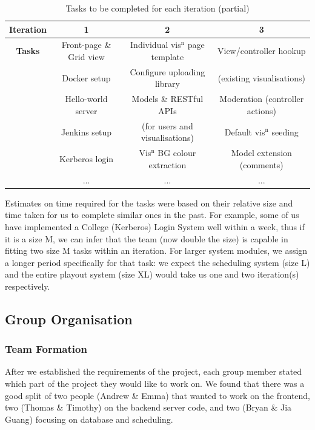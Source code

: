 \documentclass[a4paper, titlepage]{article}
\begin{document}
\begin{table}[h]
  \begin{tabular}{c | c | c | c }
    \textbf{Iteration} & 1 & 2 & 3 \\ \hline
   \textbf{Tasks} & Front-page \& Grid view & Individual vis$^\textrm{n}$ page template & View/controller hookup\\
      & Docker setup & Configure uploading library & (existing visualisations)\\
      & Hello-world server & Models \& RESTful APIs& Moderation (controller actions)\\
      & Jenkins setup & (for users and visualisations)& Default vis$^\textrm{n}$ seeding\\
      & Kerberos login& Vis$^\textrm{n}$ BG colour extraction & Model extension (comments)\\
      & ... & ... & ...
  \end{tabular}
  \caption{Tasks to be completed for each iteration (partial)}
  \label{tab:projman_iplan}
\end{table}


Estimates on time required for the tasks were based on their relative size and
time taken for us to complete similar ones in the past. For example, some of us
have implemented a College (Kerberos) Login System well within a week, thus if
it is a size M, we can infer that the team (now double the size) is capable in 
fitting two size M tasks within an iteration. For larger system modules, we
assign a longer period specifically for that task: we expect the scheduling
system (size L) and the entire playout system (size XL) would take us one and
two iteration(s) respectively.


\subsection{Group Organisation} \label{sec:projman_group}

\subsubsection{Team Formation}
After we established the requirements of the project, each group member stated
which part of the project they would like to work on. We found that there was a
good split of two people (Andrew \& Emma) that wanted to work on the frontend,
two (Thomas \& Timothy) on the backend server code, and two (Bryan \& Jia Guang)
focusing on database and scheduling.
\end{document}
